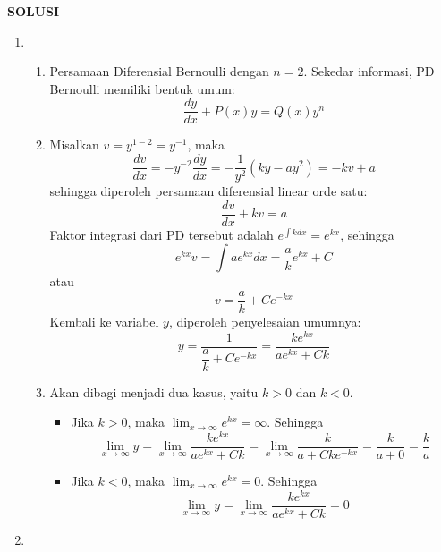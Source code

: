 \documentclass[10pt,openany,a4paper]{article}
\begin{document}
\begin{center}
  \textbf{SOLUSI}
\end{center}
\begin{enumerate}
  \item \begin{enumerate}
          \item Persamaan Diferensial Bernoulli dengan $n=2$. Sekedar informasi, PD Bernoulli memiliki bentuk umum:
                \[
                  \dfrac{dy}{dx} + P(x)y = Q(x)y^n
                \]
          \item Misalkan $v = y^{1-2} = y^{-1}$, maka
                \[
                  \dfrac{dv}{dx} = -y^{-2}\dfrac{dy}{dx} = -\dfrac{1}{y^2}(ky - ay^2) = -kv + a
                \]
                sehingga diperoleh persamaan diferensial linear orde satu:
                \[
                  \dfrac{dv}{dx} + kv = a
                \]
                Faktor integrasi dari PD tersebut adalah $e^{\int k dx} = e^{kx}$, sehingga
                \[
                  e^{kx}v = \int ae^{kx} dx = \dfrac{a}{k}e^{kx} + C
                \]
                atau
                \[
                  v = \dfrac{a}{k} + Ce^{-kx}
                \]
                Kembali ke variabel $y$, diperoleh penyelesaian umumnya:
                \[
                  y = \dfrac{1}{\dfrac{a}{k} + Ce^{-kx}} = \dfrac{k e^{kx}}{a e^{kx} + Ck}
                \]
          \item Akan dibagi menjadi dua kasus, yaitu $k>0$ dan $k<0$.
                \begin{itemize}
                  \item Jika $k>0$, maka $\displaystyle\lim_{x\to\infty} e^{kx} = \infty$. Sehingga
                        \[
                          \lim_{x\to\infty} y = \lim_{x\to\infty} \dfrac{k e^{kx}}{a e^{kx} + Ck} = \lim_{x\to\infty} \dfrac{k}{a + Ck e^{-kx}} = \dfrac{k}{a+0} = \dfrac{k}{a}
                        \]
                  \item Jika $k<0$, maka $\displaystyle\lim_{x\to\infty} e^{kx} = 0$. Sehingga
                        \[
                          \lim_{x\to\infty} y = \lim_{x\to\infty} \dfrac{k e^{kx}}{a e^{kx} + Ck} = 0
                        \]
                \end{itemize}
        \end{enumerate}
  \item \begin{enumerate}

\end{enumerate}
\end{enumerate}
\end{document}
